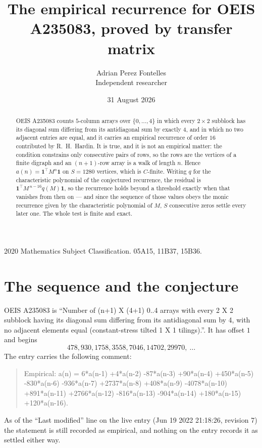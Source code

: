 \documentclass[11pt,a4paper]{article}
\title{The empirical recurrence for OEIS A235083, proved by transfer matrix}
\author{Adrian Perez Fontelles\\ \small Independent researcher}
\date{31 August 2026}
\theoremstyle{plain}
\theoremstyle{definition}
\begin{document}
\maketitle

\begin{abstract}
OEIS A235083 counts $5$-column arrays over $\{0,\dots,4\}$ in which every
$2\times2$ subblock has its diagonal sum differing from its antidiagonal sum by
exactly $4$, and in which no two adjacent entries are equal, and it
carries an empirical recurrence of order $16$ contributed by R.~H.~Hardin. It is true,
and it is not an empirical matter: the condition constrains only consecutive pairs of rows,
so the rows are the vertices of a finite digraph and an $(n+1)$-row array is a walk of
length $n$. Hence $a(n)=\mathbf{1}^{\!\top}M^{n}\mathbf{1}$ on $S=1280$ vertices, which
is $C$-finite. Writing $q$ for the characteristic polynomial of the conjectured recurrence,
the residual is $\mathbf{1}^{\!\top}M^{\,n-16}q(M)\mathbf{1}$, so the recurrence
holds beyond a threshold exactly when that vanishes from then on --- and since the sequence
of those values obeys the monic recurrence given by the characteristic polynomial of $M$,
$S$ consecutive zeros settle every later one. The whole test is finite and exact.
\end{abstract}

\noindent\small 2020 Mathematics Subject Classification. 05A15, 11B37, 15B36.\normalsize

\section{The sequence and the conjecture}

OEIS A235083 is ``Number of (n+1) X (4+1) 0..4 arrays with every 2 X 2 subblock having its diagonal sum differing from its antidiagonal sum by 4, with no adjacent elements equal (constant-stress tilted 1 X 1 tilings).''. It has offset
$1$ and begins
\[
478, 930, 1758, 3558, 7046, 14702, 29970,\ \dots
\]
The entry carries the following comment:
\begin{quote}\small
Empirical: a(n) = 6*a(n-1) +4*a(n-2) -87*a(n-3) +90*a(n-4) +450*a(n-5) -830*a(n-6) -936*a(n-7) +2737*a(n-8) +408*a(n-9) -4078*a(n-10) +891*a(n-11) +2766*a(n-12) -816*a(n-13) -904*a(n-14) +180*a(n-15) +120*a(n-16).
\end{quote}
As of the ``Last modified'' line on the live entry (Jun 19 2022 21:18:26, revision 7) the statement is
still recorded as empirical, and nothing on the entry records it as settled either way.
\end{document}
